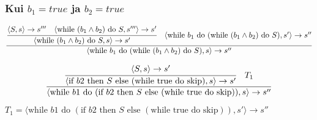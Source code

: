 \subsubsection{Kui \(b_1 = true\) ja \(b_2 = true\)}

\[
  \frac{
    \cfrac{
      \langle
      S, s
      \rangle \rightarrow s'''
      \quad
      \langle
      \text{while } (b_1 \wedge b_2) \text{ do } S, s'''
      \rangle \rightarrow s'
    }{
      \langle
      \text{while } (b_1 \wedge b_2) \text{ do } S, s
      \rangle \rightarrow s'
    }
    \quad
    \langle
    \text{while } b_1 \text{ do } (\text{while } (b_1 \wedge b_2) \text{ do } S), s'
    \rangle \rightarrow s''
  }{
    \langle
    \text{while } b_1 \text{ do } (\text{while } (b_1 \wedge b_2) \text{ do } S), s
    \rangle \rightarrow s''
  }
\] 


\[
  \frac{
    \cfrac{
      \langle
      S, s
      \rangle \rightarrow s'
    }{
      \langle
      \text{if } b2 \text{ then } S \text{ else }
      (\text{while true do skip})
      ,s
      \rangle
      \rightarrow s'
    }
    \quad
    T_1
  }{
    \langle
    \text{while } b1 \text{ do } (\text{if } b2 \text{ then } S \text{ else }
    (\text{while true do skip}))
    ,s
    \rangle \rightarrow s''
  }
\] 

\(T_1 = 
  \langle
  \text{while } b1 \text{ do } (\text{if } b2 \text{ then } S \text{ else }
  (\text{while true do skip}))
  ,s'
  \rangle \rightarrow s''
\)
